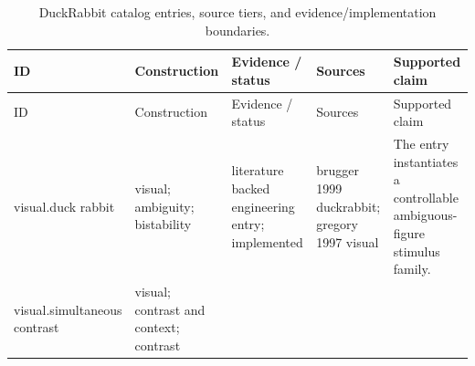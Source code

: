 \documentclass[
  english,
]{article}
\begin{document}
\begin{longtable}[]{@{}
  >{\raggedright\arraybackslash}p{}
  >{\raggedright\arraybackslash}p{}
  >{\raggedright\arraybackslash}p{}
  >{\raggedright\arraybackslash}p{}
  >{\raggedright\arraybackslash}p{}@{}}
\caption{DuckRabbit catalog entries, source tiers, and
evidence/implementation boundaries.}\label{tbl:catalog}\tabularnewline
\toprule\noalign{}
\begin{minipage}[b]{\linewidth}\raggedright
ID
\end{minipage} & \begin{minipage}[b]{\linewidth}\raggedright
Construction
\end{minipage} & \begin{minipage}[b]{\linewidth}\raggedright
Evidence / status
\end{minipage} & \begin{minipage}[b]{\linewidth}\raggedright
Sources
\end{minipage} & \begin{minipage}[b]{\linewidth}\raggedright
Supported claim
\end{minipage} \\
\midrule\noalign{}
\endfirsthead
\toprule\noalign{}
\begin{minipage}[b]{\linewidth}\raggedright
ID
\end{minipage} & \begin{minipage}[b]{\linewidth}\raggedright
Construction
\end{minipage} & \begin{minipage}[b]{\linewidth}\raggedright
Evidence / status
\end{minipage} & \begin{minipage}[b]{\linewidth}\raggedright
Sources
\end{minipage} & \begin{minipage}[b]{\linewidth}\raggedright
Supported claim
\end{minipage} \\
\midrule\noalign{}
\endhead
\bottomrule\noalign{}
\endlastfoot
visual.duck rabbit & visual; ambiguity; bistability & literature backed
engineering entry; implemented & brugger 1999 duckrabbit; gregory 1997
visual & The entry instantiates a controllable ambiguous-figure stimulus
family. \\
visual.simultaneous contrast & visual; contrast and context; contrast

\end{longtable}
\end{document}
